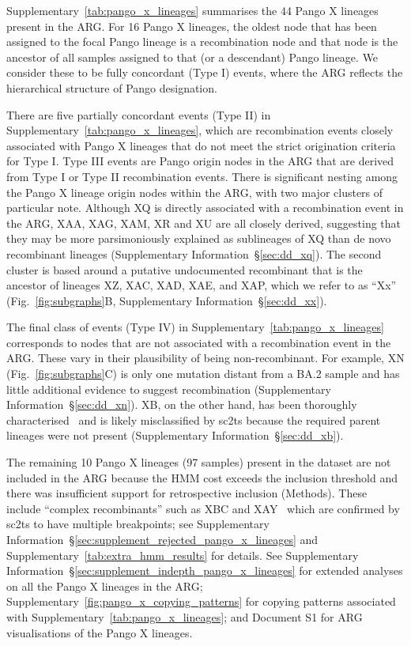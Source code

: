 \documentclass[12pt]{article}
\newcommand{\supref}[1]{Supplementary Information~\S\ref{#1}}
\newcommand{\figref}[1]{Fig.~\ref{#1}}
\newcommand{\siref}[1]{Supplementary~\ref{#1}}
\begin{document}
\siref{tab:pango_x_lineages} summarises
the 44 Pango X lineages present in the ARG.
For 16 Pango X lineages, the oldest node
that has been assigned to the focal Pango lineage is a recombination node and
that node is the ancestor of all samples
assigned to that (or a descendant) Pango lineage.
We consider these to be fully concordant (Type I) events,
where the ARG reflects the
hierarchical structure of Pango designation.

There are five partially concordant events (Type II)
in \siref{tab:pango_x_lineages}, which
are recombination events closely associated with Pango X lineages
that do not meet the strict origination criteria for Type I.
Type III events are Pango origin nodes in the ARG that are
derived from Type I or Type II recombination events. There is significant
nesting among the Pango X lineage origin nodes within the ARG,
with two major clusters of particular note. Although XQ is
directly associated with a recombination event in the ARG,
XAA, XAG, XAM, XR and XU are all closely derived, suggesting
that they may be more parsimoniously explained as sublineages of XQ
than de novo recombinant lineages (\supref{sec:dd_xq}).
The second cluster is based around a putative undocumented
recombinant that is the ancestor of lineages
XZ, XAC, XAD, XAE, and XAP, which we refer to as ``Xx''
(\figref{fig:subgraphs}B, \supref{sec:dd_xx}).

The final class of events (Type IV) in \siref{tab:pango_x_lineages}
corresponds to nodes that are not associated with a recombination event
in the ARG.
These vary in their plausibility of being non-recombinant.
For example, XN (\figref{fig:subgraphs}C) is only one mutation
distant from a BA.2 sample and has little additional evidence
to suggest recombination (\supref{sec:dd_xn}).
XB, on the other hand,
has been thoroughly characterised~\cite{Gutierrez2022} and
is likely misclassified by sc2ts because the required
parent lineages were not present (\supref{sec:dd_xb}).

The remaining 10 Pango X lineages (97 samples) present in the dataset are not
included in the ARG because the HMM cost exceeds the inclusion threshold
and there was insufficient support for retrospective inclusion (Methods).
These include ``complex recombinants'' such as XBC and XAY~\cite{Roemer2023}
which are confirmed by sc2ts to have multiple breakpoints; see
\supref{sec:supplement_rejected_pango_x_lineages} and
\siref{tab:extra_hmm_results} for details.
See \supref{sec:supplement_indepth_pango_x_lineages}
for extended analyses on all the Pango X lineages in the ARG;
\siref{fig:pango_x_copying_patterns} for copying patterns
associated with \siref{tab:pango_x_lineages};
and Document S1 for ARG visualisations of the Pango X lineages.
\end{document}
